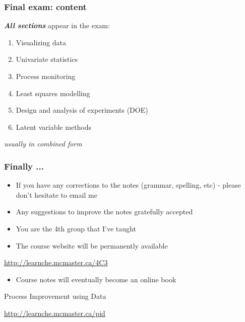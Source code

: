 \begin{frame}\frametitle{Final exam: content}
	
	\textbf{\emph{All sections}} appear in the exam:
	\begin{enumerate}
		\item	Visualizing data 
		\item	Univariate statistics 
		\item	Process monitoring 
		\item	Least squares modelling 
		\item	Design and analysis of experiments (DOE) 
		\item	Latent variable methods 
	\end{enumerate}
	\emph{usually in combined form}
\end{frame}

\begin{frame}\frametitle{Finally ...}
	\begin{itemize}
		\item	If you have any corrections to the notes (grammar, spelling, etc) - please don't hesitate to email me 
		\item	Any suggestions to improve the notes gratefully accepted 
		\item	You are the 4th group that I've taught
		\item	The course website will be permanently available 
	\end{itemize}
	\begin{block}{}
		\href{http://learnche.mcmaster.ca/4C3}{http://learnche.mcmaster.ca/4C3}
	\end{block}

	\vspace{24pt}
	\begin{itemize}
		\item	Course notes will eventually become an online book 
	\end{itemize}
		
	\begin{block}
		{Process Improvement using Data} 
		\begin{center}
			\href{http://learnche.mcmaster.ca/pid}{http://learnche.mcmaster.ca/pid} 
		\end{center}
	\end{block}
\end{frame}


